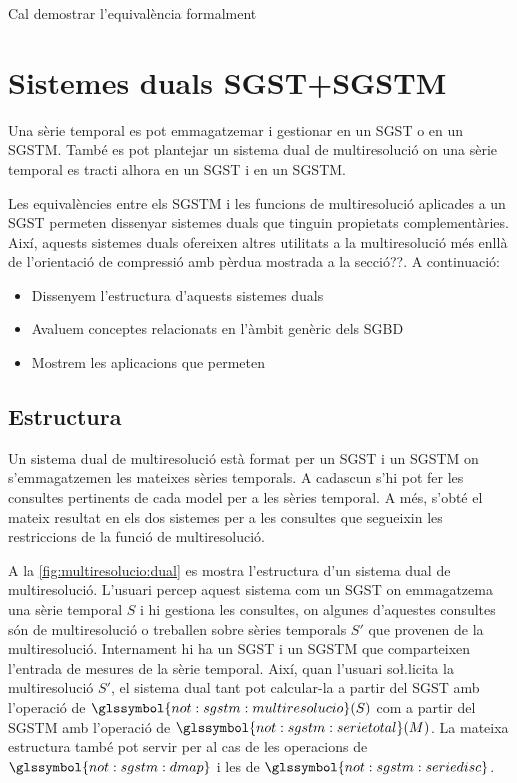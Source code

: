 Cal demostrar l'equivalència formalment\todo{}





\section{Sistemes duals SGST+SGSTM}

Una sèrie temporal es pot emmagatzemar i gestionar en un \gls{SGST} o
en un \gls{SGSTM}. També es pot plantejar un sistema dual de
multiresolució on una sèrie temporal es tracti alhora en un \gls{SGST}
i en un \gls{SGSTM}.

Les equivalències entre els \gls{SGSTM} i les funcions de
multiresolució aplicades a un \gls{SGST} permeten dissenyar sistemes
duals que tinguin propietats complementàries.  Així, aquests sistemes
duals ofereixen altres utilitats a la multiresolució més enllà de
l'orientació de compressió amb pèrdua mostrada a la secció??. A continuació:
\begin{itemize}
\item Dissenyem l'estructura d'aquests sistemes duals
\item Avaluem conceptes relacionats en l'àmbit genèric dels \gls{SGBD}
\item Mostrem les aplicacions que permeten
\end{itemize}




\subsection{Estructura}

Un sistema dual de multiresolució està format per un \gls{SGST} i un
\gls{SGSTM} on s'emmagatzemen les mateixes sèries temporals. A
cadascun s'hi pot fer les consultes pertinents de cada model per a les
sèries temporal. A més, s'obté el mateix resultat en els dos sistemes
per a les consultes que segueixin les restriccions de la funció de
multiresolució.


A la \autoref{fig:multiresolucio:dual} es mostra l'estructura d'un
sistema dual de multiresolució. L'usuari percep aquest sistema com un
\gls{SGST} on emmagatzema una sèrie temporal $S$ i hi gestiona les
consultes, on algunes d'aquestes consultes són de multiresolució o
treballen sobre sèries temporals $S'$ que provenen de la
multiresolució.  Internament hi ha un \gls{SGST} i un \gls{SGSTM} que
comparteixen l'entrada de mesures de la sèrie temporal. Així, quan
l'usuari so\l.licita la multiresolució $S'$, el sistema dual tant pot
calcular-la a partir del \gls{SGST} amb l'operació de
$\glssymbol{not:sgstm:multiresolucio}(S)$ com a partir del \gls{SGSTM}
amb l'operació de $\glssymbol{not:sgstm:serietotal}(M)$.  La mateixa
estructura també pot servir per al cas de les operacions de
$\glssymbol{not:sgstm:dmap}$ i les de
$\glssymbol{not:sgstm:seriedisc}$.


